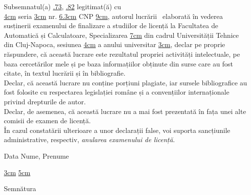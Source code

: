 \begin{minipage}{\linewidth}
	\indent Subsemnatul(a) \uline{.73\linewidth},
	\uline{.82\linewidth}
	legitimat(ă) cu\\ \uline{4cm} seria \uline{3cm} nr. \uline{6.3cm}
	CNP \uline{9cm}, autorul lucrării\
	\uline{\linewidth}
	\uline{\linewidth}
	elaborată în vederea susținerii examenului de finalizare a studiilor de licență la Facultatea de Automatică și Calculatoare, Specializarea \uline{7cm} din cadrul Universității Tehnice din Cluj-Napoca, sesiunea \uline{4cm} a anului universitar \uline{3cm}, declar pe proprie răspundere, că această lucrare este rezultatul propriei activități intelectuale, pe baza cercetărilor mele și pe baza informațiilor obținute din surse care au fost citate, în textul lucrării și în bibliografie.\\
	\hspace*{8mm} Declar, că această lucrare nu conține porțiuni plagiate, iar sursele bibliografice au fost folosite cu respectarea legislației române și a convențiilor internaționale privind drepturile de autor.\\
	\hspace*{8mm} Declar, de asemenea, că această lucrare nu a mai fost prezentată în fața unei alte comisii de examen de licență.\\
	\hspace*{8mm} În cazul constatării ulterioare a unor declarații false, voi suporta sancțiunile administrative, respectiv, \emph{anularea examenului de licență}.
\end{minipage}
\vspace{1.5cm}

Data \hspace{8cm} Nume, Prenume

\vspace{0.5cm}

\uline{3cm} \hspace{5cm} \uline{5cm}

\vspace{1cm}
\hspace{9.4cm}Semnătura
\newpage
